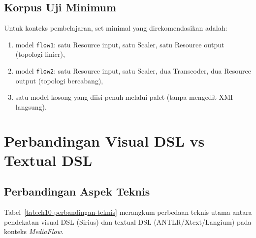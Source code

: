 \subsection{Korpus Uji Minimum}

Untuk konteks pembelajaran, set minimal yang direkomendasikan adalah:
\begin{enumerate}
  \item model \texttt{flow1}: satu Resource input, satu Scaler, satu Resource output (topologi linier),
  \item model \texttt{flow2}: satu Resource input, satu Scaler, dua Transcoder, dua Resource output (topologi bercabang),
  \item satu model kosong yang diisi penuh melalui palet (tanpa mengedit XMI langsung).
\end{enumerate}

\section{Perbandingan Visual DSL vs Textual DSL}

\subsection{Perbandingan Aspek Teknis}

Tabel~\ref{tab:ch10-perbandingan-teknis} merangkum perbedaan teknis utama antara pendekatan visual DSL (Sirius) dan textual DSL (ANTLR/Xtext/Langium) pada konteks \textit{MediaFlow}.

